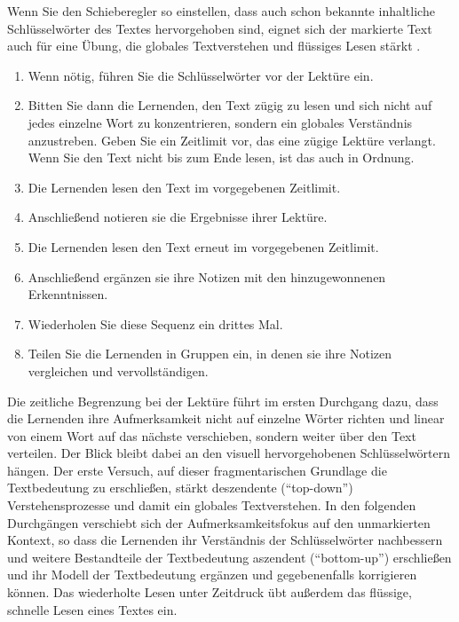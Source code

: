 \documentclass[11pt]{article}\usepackage[]{graphicx}\usepackage[]{color}
\begin{document}
Wenn Sie den Schieberegler so einstellen, dass auch schon bekannte inhaltliche Schlüsselwörter des Textes hervorgehoben sind, eignet sich der markierte Text auch für eine Übung, die globales Textverstehen und flüssiges Lesen stärkt \parencite[angelehnt an][115]{Watkins.2017}. 

\begin{enumerate}
\itemsep0em 
\item Wenn nötig, führen Sie die Schlüsselwörter vor der Lektüre ein. 
\item Bitten Sie dann die Lernenden, den Text zügig zu lesen und sich nicht auf jedes einzelne Wort zu konzentrieren, sondern ein globales Verständnis anzustreben. Geben Sie ein Zeitlimit vor, das eine zügige Lektüre verlangt. Wenn Sie den Text nicht bis zum Ende lesen, ist das auch in Ordnung.
\item Die Lernenden lesen den Text im vorgegebenen Zeitlimit. 
\item Anschließend notieren sie die Ergebnisse ihrer Lektüre. 
\item Die Lernenden lesen den Text erneut im vorgegebenen Zeitlimit. 
\item Anschließend ergänzen sie ihre Notizen mit den hinzugewonnenen Erkenntnissen. 
\item Wiederholen Sie diese Sequenz ein drittes Mal. 
\item Teilen Sie die Lernenden in Gruppen ein, in denen sie ihre Notizen vergleichen und vervollständigen. 
\end{enumerate}

\noindent Die zeitliche Begrenzung bei der Lektüre führt im ersten Durchgang dazu, dass die Lernenden ihre Aufmerksamkeit nicht auf einzelne Wörter richten und linear von einem Wort auf das nächste verschieben, sondern weiter über den Text verteilen. Der Blick bleibt dabei an den visuell hervorgehobenen Schlüsselwörtern hängen. Der erste Versuch, auf dieser fragmentarischen Grundlage die Textbedeutung zu erschließen, stärkt deszendente ("`top-down"') Verstehensprozesse und damit ein globales Textverstehen. In den folgenden Durchgängen verschiebt sich der Aufmerksamkeitsfokus auf den unmarkierten Kontext, so dass die Lernenden ihr Verständnis der Schlüsselwörter nachbessern und weitere Bestandteile der Textbedeutung aszendent ("`bottom-up"') erschließen und ihr Modell der Textbedeutung ergänzen und gegebenenfalls korrigieren können. Das wiederholte Lesen unter Zeitdruck übt außerdem das flüssige, schnelle Lesen eines Textes ein.
\end{document}
